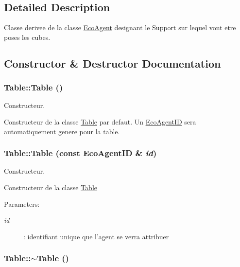 \subsection{Detailed Description}
Classe derivee de la classe \hyperlink{classEcoAgent}{EcoAgent} designant le Support sur lequel vont etre poses les cubes. 

\subsection{Constructor \& Destructor Documentation}
\hypertarget{classTable_049f2e06391781ae255c6698869c4ad1}{
\subsubsection[{Table}]{\setlength{\rightskip}{0pt plus 5cm}Table::Table ()}}
\label{classTable_049f2e06391781ae255c6698869c4ad1}


Constructeur. 

Constructeur de la classe \hyperlink{classTable}{Table} par defaut. Un \hyperlink{classEcoAgentID}{EcoAgentID} sera automatiquement genere pour la table. \hypertarget{classTable_6fbbe063e4ee08c066a1095a7320acf4}{
\subsubsection[{Table}]{\setlength{\rightskip}{0pt plus 5cm}Table::Table (const {\bf EcoAgentID} \& {\em id})}}
\label{classTable_6fbbe063e4ee08c066a1095a7320acf4}


Constructeur. 

Constructeur de la classe \hyperlink{classTable}{Table}

\begin{Desc}
\item[Parameters:]
\begin{description}
\item[{\em id}]: identifiant unique que l'agent se verra attribuer \end{description}
\end{Desc}
\hypertarget{classTable_9a559f2e7beb37b511ee9f88873164f8}{
\subsubsection[{$\sim$Table}]{\setlength{\rightskip}{0pt plus 5cm}Table::$\sim$Table ()}}
\label{classTable_9a559f2e7beb37b511ee9f88873164f8}


